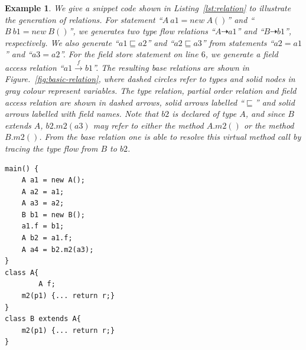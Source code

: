 \documentclass{fac}
\newtheorem{Example}{Example}
\newcommand{\less}{\sqsubseteq}
\newcommand{\tflow}{\dashrightarrow}
\newcommand{\hflow}{\longrightarrow}
\newcommand{\lhflow}[1]{\stackrel{#1}{\hflow}}
\begin{document}
\begin{Example}\label{ex:def1}
We give a snippet code shown in Listing~\ref{lst:relation} to illustrate the generation of relations. For statement ``$A\ a1=new \ A()$'' and ``$B\ b1=new\ B()$'', we generates two type flow relations ``$A \tflow a1$'' and ``$B \tflow b1$'', respectively. We also generate ``$a1 \less a2$'' and ``$a2 \less a3$'' from statements ``$a2=a1$'' and ``$a3=a2$''. For the field store statement on line $6$, we generate a field access relation ``$a1 \lhflow{f} b1$''. The resulting base relations are shown in Figure.~\ref{fig:basic-relation}, where dashed circles refer to types and solid nodes in gray colour represent variables. The type relation, partial order relation and field access relation are shown in dashed arrows, solid arrows labelled ``$\less$'' and solid arrows labelled with field names.
Note that $b2$ is declared of type $A$, and since $B$ extends $A$, $b2.m2(a3)$ may refer to either the method $A.m2()$ or the method $B.m2()$. From the base relation one is able to resolve this virtual method call by tracing the type flow from $B$ to $b2$. 
\end{Example}
\begin{minipage}{\linewidth}
\begin{lstlisting}[caption={An example showing the generation of base relations},label={lst:relation}]
main() {
	A a1 = new A();
	A a2 = a1;
	A a3 = a2;
	B b1 = new B();
	a1.f = b1;
	A b2 = a1.f;
	A a4 = b2.m2(a3);
}
class A{
        A f;
 	m2(p1) {... return r;}
}
class B extends A{
	m2(p1) {... return r;}
}
\end{lstlisting}
\end{minipage}
\end{document}
